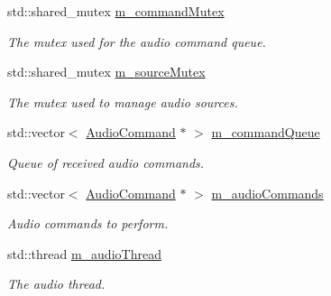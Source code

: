 \begin{Indent}
\begin{DoxyCompactItemize}
\mbox{\label{classrev_1_1_sound_manager_ab8c068138cf36ea153175bc53b0cac8b}} 
std\+::shared\+\_\+mutex \mbox{\hyperlink{classrev_1_1_sound_manager_ab8c068138cf36ea153175bc53b0cac8b}{m\+\_\+command\+Mutex}}
\begin{DoxyCompactList}\small\item\em The mutex used for the audio command queue. \end{DoxyCompactList}\item 
\mbox{\label{classrev_1_1_sound_manager_aae19c4694749931c0cfe339261502435}} 
std\+::shared\+\_\+mutex \mbox{\hyperlink{classrev_1_1_sound_manager_aae19c4694749931c0cfe339261502435}{m\+\_\+source\+Mutex}}
\begin{DoxyCompactList}\small\item\em The mutex used to manage audio sources. \end{DoxyCompactList}\item 
\mbox{\label{classrev_1_1_sound_manager_a5b87e5873e70adf7e1aacacec18d81ba}} 
std\+::vector$<$ \mbox{\hyperlink{classrev_1_1_audio_command}{Audio\+Command}} $\ast$ $>$ \mbox{\hyperlink{classrev_1_1_sound_manager_a5b87e5873e70adf7e1aacacec18d81ba}{m\+\_\+command\+Queue}}
\begin{DoxyCompactList}\small\item\em Queue of received audio commands. \end{DoxyCompactList}\item 
\mbox{\label{classrev_1_1_sound_manager_ac20c89ee674976352bd68391a6b68054}} 
std\+::vector$<$ \mbox{\hyperlink{classrev_1_1_audio_command}{Audio\+Command}} $\ast$ $>$ \mbox{\hyperlink{classrev_1_1_sound_manager_ac20c89ee674976352bd68391a6b68054}{m\+\_\+audio\+Commands}}
\begin{DoxyCompactList}\small\item\em Audio commands to perform. \end{DoxyCompactList}\item 
\mbox{\label{classrev_1_1_sound_manager_add4777424f4f16b3858cc019033bb610}} 
std\+::thread \mbox{\hyperlink{classrev_1_1_sound_manager_add4777424f4f16b3858cc019033bb610}{m\+\_\+audio\+Thread}}
\begin{DoxyCompactList}\small\item\em The audio thread. \end{DoxyCompactList}\item 

\end{DoxyCompactItemize}
\end{Indent}
